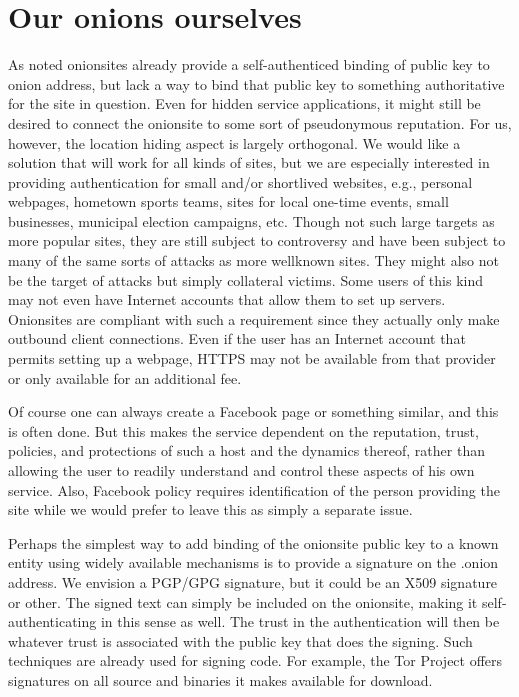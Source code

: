 \documentclass[10pt, conference, compsocconf]{styles/IEEEtran}
\begin{document}
\section{Our onions ourselves}

As noted onionsites already provide a self-authenticed binding of
public key to onion address, but lack a way to bind that public key to
something authoritative for the site in question.  Even for hidden
service applications, it might still be desired to connect the
onionsite to some sort of pseudonymous reputation.  For us, however,
the location hiding aspect is largely orthogonal.  We would like a solution
that will work for all kinds of sites, but we are especially
interested in providing authentication for small and/or shortlived
websites, e.g., personal webpages, hometown sports teams, sites for
local one-time events, small businesses, municipal election campaigns,
etc.  Though not such large targets as more popular sites, they are
still subject to controversy and have been subject to many of the same
sorts of attacks as more wellknown sites.  They might also not be
the target of attacks but simply collateral victims. 
Some users of this kind may
not even have Internet accounts that allow them to set up
servers. Onionsites are compliant with such a requirement since they
actually only make outbound client connections.
Even if the user has an Internet account that permits setting up
a webpage, HTTPS may not be available from that provider or only
available for an additional fee. 

Of course one can always create a Facebook page or something similar,
and this is often done.  But this makes the service dependent on the
reputation, trust, policies, and protections of such a host and the
dynamics thereof, rather than allowing the user to readily understand
and control these aspects of his own service. Also, Facebook
policy requires identification of the person providing the site
while we would prefer to leave this as simply a separate issue.

Perhaps the simplest way to add binding of the onionsite public key to
a known entity using widely available mechanisms is to provide a
signature on the .onion address. We envision a PGP/GPG signature, but
it could be an X509 signature or other. The signed text can simply be
included on the onionsite, making it self-authenticating in this sense
as well. The trust in the authentication will then be whatever trust
is associated with the public key that does the signing. Such
techniques are already used for signing code. For example,
the Tor Project offers signatures on all source and binaries
it makes available for download.
\end{document}
